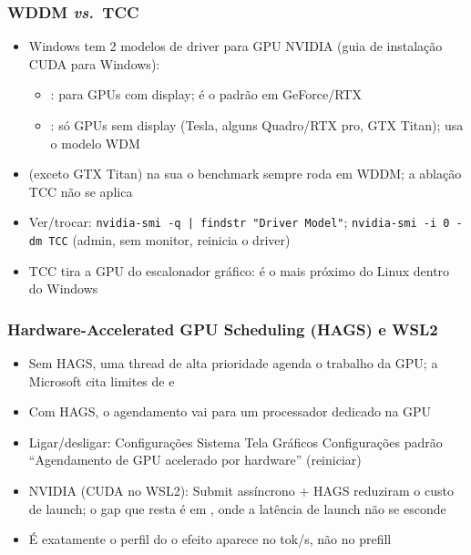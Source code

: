 \documentclass[11pt, aspectratio=169, usepdftitle=false]{beamer}
\newcommand{\vs}{\textit{vs.}\ }
\begin{document}
\begin{frame}
\frametitle{WDDM \vs TCC}
\begin{itemize}
\item Windows tem 2 modelos de driver para GPU NVIDIA (guia de instalação CUDA para Windows):
\begin{itemize}
\item {}: para GPUs com display; é o padrão em GeForce/RTX
\item {}: só GPUs sem display (Tesla, alguns Quadro/RTX pro, GTX Titan); usa o modelo WDM
\end{itemize}
\item {} (exceto GTX Titan) \so na sua  o benchmark sempre roda em WDDM; a ablação TCC não se aplica
\item Ver/trocar: \texttt{nvidia-smi -q | findstr "Driver Model"}; \texttt{nvidia-smi -i 0 -dm TCC} (admin, sem monitor, reinicia o driver)
\item TCC tira a GPU do escalonador gráfico: é o mais próximo do Linux dentro do Windows
\end{itemize}
\end{frame}

\begin{frame}
\frametitle{Hardware-Accelerated GPU Scheduling (HAGS) e WSL2}
\begin{itemize}
\item Sem HAGS, uma thread de alta prioridade  agenda o trabalho da GPU; a Microsoft cita limites de  e 
\item Com HAGS, o agendamento vai para um processador dedicado na GPU
\item Ligar/desligar: Configurações \so Sistema \so Tela \so Gráficos \so Configurações padrão \so ``Agendamento de GPU acelerado por hardware'' (reiniciar)
\item NVIDIA (CUDA no WSL2): Submit assíncrono + HAGS reduziram o custo de launch; o gap que resta é em , onde a latência de launch não se esconde
\item É exatamente o perfil do  \so o efeito aparece no tok/s, não no prefill
\end{itemize}
\end{frame}
\end{document}
